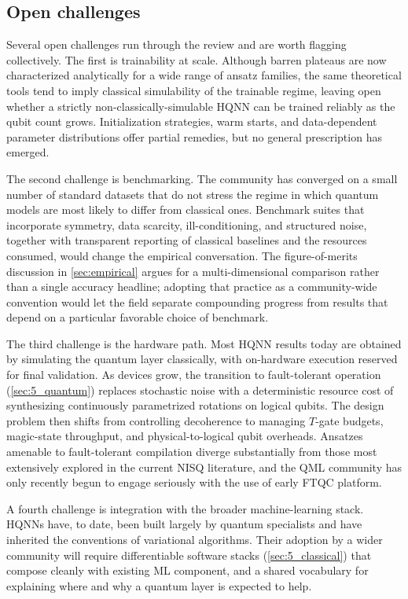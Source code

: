 \documentclass[aps,10pt,groupedaddress,prx,superscriptaddress,twocolumn,balancelastpage, tightenlines]{revtex4-2}
\theoremstyle{plain}  %
\begin{document}
\subsection{Open challenges}

Several open challenges run through the review and are worth flagging collectively. The first is trainability at scale. Although barren plateaus are now characterized analytically for a wide range of ansatz families, the same theoretical tools tend to imply classical simulability of the trainable regime, leaving open whether a strictly non-classically-simulable \gls{HQNN} can be trained reliably as the qubit count grows. Initialization strategies, warm starts, and data-dependent parameter distributions offer partial remedies, but no general prescription has emerged.

The second challenge is benchmarking. The community has converged on a small number of standard datasets that do not stress the regime in which quantum models are most likely to differ from classical ones. Benchmark suites that incorporate symmetry, data scarcity, ill-conditioning, and structured noise, together with transparent reporting of classical baselines and the resources consumed, would change the empirical conversation. The figure-of-merits discussion in \autoref{sec:empirical} argues for a multi-dimensional comparison rather than a single accuracy headline; adopting that practice as a community-wide convention would let the field separate compounding progress from results that depend on a particular favorable choice of benchmark.

The third challenge is the hardware path. Most \gls{HQNN} results today are obtained by simulating the quantum layer classically, with on-hardware execution reserved for final validation. As devices grow, the transition to fault-tolerant operation (\autoref{sec:5_quantum}) replaces stochastic noise with a deterministic resource cost of synthesizing continuously parametrized rotations on logical qubits. The design problem then shifts from controlling decoherence to managing $T$-gate budgets, magic-state throughput, and physical-to-logical qubit overheads. Ansatzes amenable to fault-tolerant compilation diverge substantially from those most extensively explored in the current \gls{NISQ} literature, and the \gls{QML} community has only recently begun to engage seriously with the use of early FTQC platform.


A fourth challenge is integration with the broader machine-learning stack. \glspl{HQNN} have, to date, been built largely by quantum specialists and have inherited the conventions of variational algorithms. Their adoption by a wider community will require differentiable software stacks (\autoref{sec:5_classical}) that compose cleanly with existing \gls{ML} component, and a shared vocabulary for explaining where and why a quantum layer is expected to help.
\end{document}

